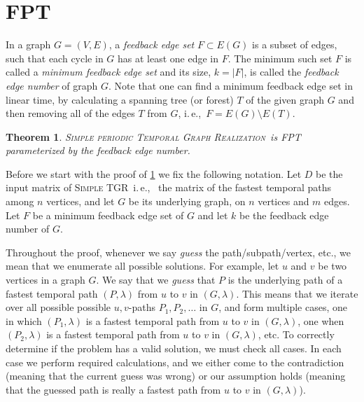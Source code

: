 \documentclass[11pt,a4paper]{article}
\newtheorem{theorem}{Theorem}
\theoremstyle{remark}
\theoremstyle{definition}
\newcommand{\ie}{i.\,e.,\ }
\newcommand{\deltaExactLong}{\textsc{Simple periodic Temporal Graph Realization}}
\newcommand{\deltaExact}{\textsc{Simple TGR}}
\begin{document}
\section{FPT}
In a graph $G=(V,E)$, a \emph{feedback edge set} $F \subset E(G)$ is a subset of edges, such that each cycle in $G$ has at least one edge in $F$.
The minimum such set $F$ is called a  \emph{minimum feedback edge set} and its size, $k = |F|$, is called the \emph{feedback edge number} of graph $G$.
Note that one can find a minimum feedback edge set in linear time, by calculating a spanning tree (or forest) $T$ of the given graph $G$ and then removing all of the edges $T$ from $G$, \ie $F = E(G) \setminus E(T)$.

\begin{theorem}\label{thm:FPTwrtFES}
    \deltaExactLong\ is FPT parameterized by the feedback edge number.
\end{theorem}

Before we start with the proof of \cref{thm:FPTwrtFES} we fix the following notation. 
Let $D$ be the input matrix of \deltaExact\ \ie
the matrix of the fastest temporal paths among $n$ vertices, and let $G$ be its underlying graph, on $n$ vertices and $m$ edges.
Let $F$ be a minimum feedback edge set of $G$ and let $k$ be the feedback edge number of $G$.

Throughout the proof, whenever we say \emph{guess} the path/subpath/vertex, etc., we mean that we enumerate all possible solutions.
For example, let $u$ and $v$ be two vertices in a graph $G$. 
We say that we \emph{guess} that $P$ is the underlying path of a fastest temporal path $(P, \lambda)$ from $u$ to $v$ in $(G, \lambda)$.
This means that we iterate over all possible possible $u,v$-paths $P_1, P_2, \dots $ in $G$, 
and form multiple cases, 
one in which $(P_1, \lambda)$ is a fastest temporal path from $u$ to $v$ in $(G,\lambda)$,
one when $(P_2, \lambda)$ is a fastest temporal path from $u$ to $v$ in $(G,\lambda)$, etc.
To correctly determine if the problem has a valid solution, we must check all cases.
In each case we perform required calculations, 
and we either come to the contradiction (meaning that the current guess was wrong) 
or our assumption holds (meaning that the guessed path is really a fastest path from $u$ to $v$ in $(G, \lambda)$).
\end{document}
